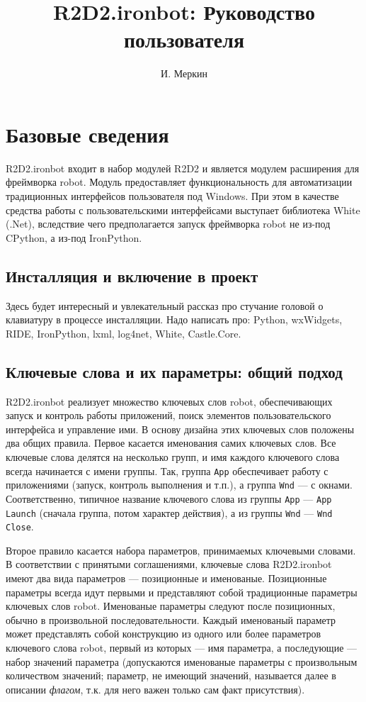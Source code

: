 \documentclass[11pt]{book} %
\title{R2D2.ironbot: Руководство пользователя}
\author{И. Меркин}
\begin{document}
\maketitle

\tableofcontents

\chapter{Базовые сведения}

R2D2.ironbot входит в набор модулей R2D2 и является модулем расширения для фреймворка robot. Модуль предоставляет функциональность для автоматизации традиционных интерфейсов пользователя под Windows. При этом в качестве средства работы с пользовательскими интерфейсами выступает библиотека White (.Net), вследствие чего предполагается запуск фреймворка robot не из-под CPython, а из-под IronPython.

\section{Инсталляция и включение в проект}

Здесь будет интересный и увлекательный рассказ про стучание головой о клавиатуру в процессе инсталляции. Надо написать про:
Python, wxWidgets, RIDE, IronPython, lxml, log4net, White, Castle.Core.


\section{Ключевые слова и их параметры: общий подход}

R2D2.ironbot реализует множество ключевых слов robot, обеспечивающих запуск и контроль работы приложений, поиск элементов пользовательского интерфейса и управление ими.
В основу дизайна этих ключевых слов положены два общих правила. Первое касается именования самих ключевых слов. Все ключевые слова делятся на несколько групп, и имя каждого ключевого слова всегда начинается с имени группы. Так, группа \verb"App" обеспечивает работу с приложениями (запуск, контроль выполнения и т.п.), а группа \verb"Wnd" --- с окнами. Соответственно, типичное название ключевого слова из группы \verb"App" --- \verb"App Launch" (сначала группа, потом характер действия), а из группы \verb"Wnd"  --- \verb"Wnd Close".

Второе правило касается набора параметров, принимаемых ключевыми словами. В соответствии с принятыми соглашениями, ключевые слова R2D2.ironbot имеют два вида параметров --- позиционные и именованые. Позиционные параметры всегда идут первыми и представляют собой традиционные параметры ключевых слов robot. Именованые параметры следуют после позиционных, обычно в произвольной последовательности. Каждый именованый параметр может представлять собой конструкцию из одного или более параметров ключевого слова robot, первый из которых --- имя параметра, а последующие --- набор значений параметра (допускаются именованые параметры с произвольным количеством значений; параметр, не имеющий значений, называется далее в описании \emph{флагом}, т.к. для него важен только сам факт присутствия).
\end{document}
